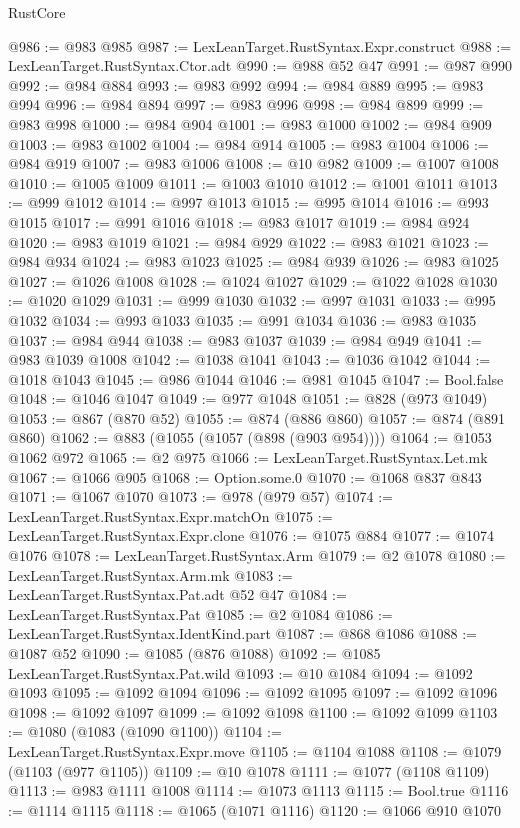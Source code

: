 \begin{lexlean}{RustCore}
\begin{coremodule}
@986 := @983 @985
@987 := LexLeanTarget.RustSyntax.Expr.construct
@988 := LexLeanTarget.RustSyntax.Ctor.adt
@990 := @988 @52 @47
@991 := @987 @990
@992 := @984 @884
@993 := @983 @992
@994 := @984 @889
@995 := @983 @994
@996 := @984 @894
@997 := @983 @996
@998 := @984 @899
@999 := @983 @998
@1000 := @984 @904
@1001 := @983 @1000
@1002 := @984 @909
@1003 := @983 @1002
@1004 := @984 @914
@1005 := @983 @1004
@1006 := @984 @919
@1007 := @983 @1006
@1008 := @10 @982
@1009 := @1007 @1008
@1010 := @1005 @1009
@1011 := @1003 @1010
@1012 := @1001 @1011
@1013 := @999 @1012
@1014 := @997 @1013
@1015 := @995 @1014
@1016 := @993 @1015
@1017 := @991 @1016
@1018 := @983 @1017
@1019 := @984 @924
@1020 := @983 @1019
@1021 := @984 @929
@1022 := @983 @1021
@1023 := @984 @934
@1024 := @983 @1023
@1025 := @984 @939
@1026 := @983 @1025
@1027 := @1026 @1008
@1028 := @1024 @1027
@1029 := @1022 @1028
@1030 := @1020 @1029
@1031 := @999 @1030
@1032 := @997 @1031
@1033 := @995 @1032
@1034 := @993 @1033
@1035 := @991 @1034
@1036 := @983 @1035
@1037 := @984 @944
@1038 := @983 @1037
@1039 := @984 @949
@1041 := @983 @1039 @1008
@1042 := @1038 @1041
@1043 := @1036 @1042
@1044 := @1018 @1043
@1045 := @986 @1044
@1046 := @981 @1045
@1047 := Bool.false
@1048 := @1046 @1047
@1049 := @977 @1048
@1051 := @828 (@973 @1049)
@1053 := @867 (@870 @52)
@1055 := @874 (@886 @860)
@1057 := @874 (@891 @860)
@1062 := @883 (@1055 (@1057 (@898 (@903 @954))))
@1064 := @1053 @1062 @972
@1065 := @2 @975
@1066 := LexLeanTarget.RustSyntax.Let.mk
@1067 := @1066 @905
@1068 := Option.some.{0}
@1070 := @1068 @837 @843
@1071 := @1067 @1070
@1073 := @978 (@979 @57)
@1074 := LexLeanTarget.RustSyntax.Expr.matchOn
@1075 := LexLeanTarget.RustSyntax.Expr.clone
@1076 := @1075 @884
@1077 := @1074 @1076
@1078 := LexLeanTarget.RustSyntax.Arm
@1079 := @2 @1078
@1080 := LexLeanTarget.RustSyntax.Arm.mk
@1083 := LexLeanTarget.RustSyntax.Pat.adt @52 @47
@1084 := LexLeanTarget.RustSyntax.Pat
@1085 := @2 @1084
@1086 := LexLeanTarget.RustSyntax.IdentKind.part
@1087 := @868 @1086
@1088 := @1087 @52
@1090 := @1085 (@876 @1088)
@1092 := @1085 LexLeanTarget.RustSyntax.Pat.wild
@1093 := @10 @1084
@1094 := @1092 @1093
@1095 := @1092 @1094
@1096 := @1092 @1095
@1097 := @1092 @1096
@1098 := @1092 @1097
@1099 := @1092 @1098
@1100 := @1092 @1099
@1103 := @1080 (@1083 (@1090 @1100))
@1104 := LexLeanTarget.RustSyntax.Expr.move
@1105 := @1104 @1088
@1108 := @1079 (@1103 (@977 @1105))
@1109 := @10 @1078
@1111 := @1077 (@1108 @1109)
@1113 := @983 @1111 @1008
@1114 := @1073 @1113
@1115 := Bool.true
@1116 := @1114 @1115
@1118 := @1065 (@1071 @1116)
@1120 := @1066 @910 @1070

\end{coremodule}
\end{lexlean}
